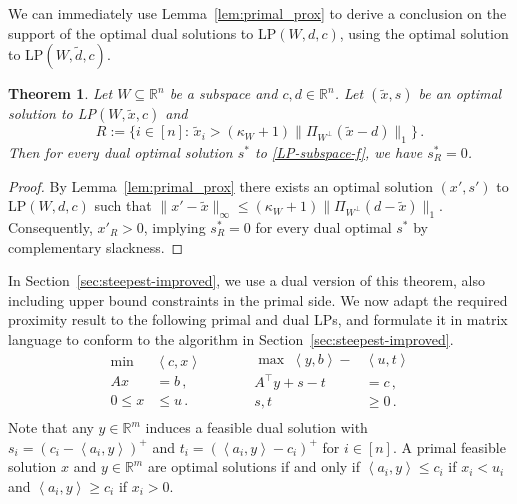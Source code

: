 \documentclass[11pt, a4paper]{article}
\newcommand{\pr}[2]{\left\langle #1, #2 \right\rangle}
\newcommand{\1}{\mathbbm{1}}
\newcommand{\proj}{\Pi}
\newtheorem{theorem}{Theorem}[section]
\theoremstyle{case}
\newcommand{\R}{\mathbb{R}}
\begin{document}
    We can immediately use Lemma~\ref{lem:primal_prox} to derive a conclusion on the support of the optimal dual solutions to LP$(W,d,c)$, using  the optimal solution to LP$(W,\tilde d,c)$. 
    \begin{theorem}\label{cor:dual-fix-weak}
        Let $W\subseteq \R^n$ be a subspace and $c, d \in \R^n$.
         Let $(\tilde x, s)$ be an optimal solution to
         LP$(W,\tilde x, c)$ and 
        \[
        R:=\{i\in [n]:\,  \tilde x_i> (\kappa_W + 1)\|\proj_{W^\perp}(\tilde x-d)\|_1\}\, .
        \]
         Then for every dual optimal solution $s^*$ to \ref{LP-subspace-f}, we have $s^*_R=0$.
    \end{theorem}
    \begin{proof}
        By Lemma~\ref{lem:primal_prox} there exists an optimal solution $(x', s')$ to LP$(W,d,c)$ such that $\|x' - \tilde x\|_\infty \le (\kappa_W + 1)\|\proj_{W^\perp}(d - \tilde x)\|_1$.
        Consequently, $x'_R>0$, implying $s^*_R=0$ for every dual optimal $s^*$ by complementary slackness.
    \end{proof}

In Section~\ref{sec:steepest-improved}, we use a dual version of this theorem, also including upper bound constraints in the primal side. We now adapt the required proximity result to the following primal and dual LPs, and formulate it in matrix language to conform to the algorithm in Section~\ref{sec:steepest-improved}.
\begin{equation}
  \label{LP_upper}
  \begin{aligned}
\min \; & \pr{c}{x} \\ 
Ax&=b\,, \\
0\leq x&\leq u\,.\\
  \end{aligned}
  \quad\quad\quad
  \begin{aligned}
  \max \;  \pr{y}{b}-&\pr{u}{t} \\
  A^\top y + s-t &= c\,, \\
  s,t & \geq 0\,. \\
  \end{aligned}
\end{equation}
Note that any $y\in\R^m$ induces a feasible dual solution with $s_i=(c_i-\pr{a_i}{y})^+$ and $t_i=(\pr{a_i}{y}-c_i)^+$ for $i\in [n]$.
A primal feasible solution  $x$  and $y\in\R^m$ are optimal solutions if and only if $\pr{a_i}{y}\le c_i$ if $x_i<u_i$ and $\pr{a_i}{y}\ge c_i$ if $x_i>0$.
\end{document}
